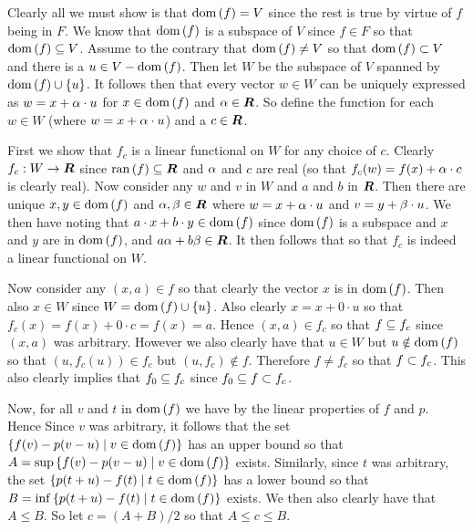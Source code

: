 \begin{questions}
{{      Clearly all we must show is that $\dom(f) = V$ since the rest is true by virtue of $f$ being in $F$.
      We know that $\dom(f)$ is a subspace of $V$ since $f \in F$ so that $\dom(f) \ss V$.
      Assume to the contrary that $\dom(f) \neq V$ so that $\dom(f) \pss V$ and there is a $u \in V - \dom(f)$.
      Then let $W$ be the subspace of $V$ spanned by $\dom(f) \cup \braces{u}$.
      It follows then that every vector $w \in W$ can be uniquely expressed as $w = x + \a \cdot u$ for $x \in \dom(f)$ and $\a \in \reals$.
      So define the function
      for each $w \in W$ (where $w = x + \a \cdot u$) and a $c \in \reals$.

      First we show that $f_c$ is a linear functional on $W$ for any choice of $c$.
      Clearly $f_c : W \to \reals$ since $\ran(f) \ss \reals$ and $\a$ and $c$ are real (so that $f_c(w) = f(x) + \a \cdot c$ is clearly real).
      Now consider any $w$ and $v$ in $W$ and $a$ and $b$ in $\reals$.
      Then there are unique $x,y \in \dom(f)$ and $\a,\b \in \reals$ where $w = x + \a \cdot u$ and $v = y + \b \cdot u$.
      We then have
      noting that $a \cdot x + b \cdot y \in \dom(f)$ since $\dom(f)$ is a subspace and $x$ and $y$ are in $\dom(f)$, and $a\a + b \b \in \reals$.
      It then follows that
      so that $f_c$ is indeed a linear functional on $W$.

      Now consider any $(x, a) \in f$ so that clearly the vector $x$ is in $\dom(f)$.
      Then also $x \in W$ since $W = \dom(f) \cup \braces{u}$.
      Also clearly $x = x + 0 \cdot u$ so that $f_c(x) = f(x) + 0 \cdot c = f(x) = a$.
      Hence $(x, a) \in f_c$ so that $f \ss f_c$ since $(x,a)$ was arbitrary.
      However we also clearly have that $u \in W$ but $u \notin \dom(f)$ so that $(u, f_c(u)) \in f_c$ but $(u, f_c) \notin f$.
      Therefore $f \neq f_c$ so that $f \pss f_c$.
      This also clearly implies that $f_0 \ss f_c$ since $f_0 \ss f \pss f_c$.

      Now, for all $v$ and $t$ in $\dom(f)$ we have
      by the linear properties of $f$ and $p$.
      Hence
      Since $v$ was arbitrary, it follows that the set $\braces{f(v) - p(v-u) \where v \in \dom(f)}$ has an upper bound so that $A = \sup\braces{f(v) - p(v-u) \where v \in \dom(f)}$ exists.
      Similarly, since $t$ was arbitrary, the set $\braces{p(t + u) - f(t) \where t \in \dom(f)}$ has a lower bound so that $B = \inf\braces{p(t + u) - f(t) \where t \in \dom(f)}$ exists.
      We then also clearly have that $A \leq B$.
      So let $c = (A + B) / 2$ so that $A \leq c \leq B$.

}}
\end{questions}
